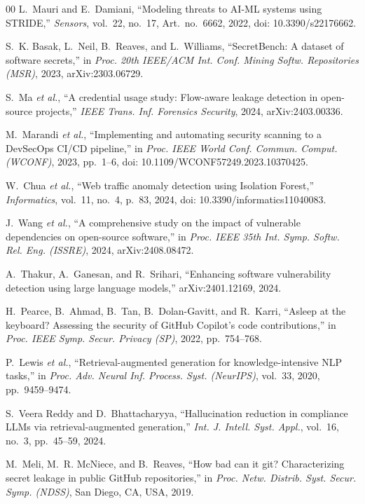 \documentclass[conference]{IEEEtran}
\begin{document}
\begin{thebibliography}{00}
L.~Mauri and E.~Damiani, ``Modeling threats to AI-ML systems using STRIDE,''
\textit{Sensors}, vol.~22, no.~17, Art.~no.~6662, 2022,
doi: 10.3390/s22176662.

S.~K. Basak, L.~Neil, B.~Reaves, and L.~Williams, ``SecretBench: A dataset of
software secrets,'' in \textit{Proc. 20th IEEE/ACM Int. Conf. Mining Softw.
Repositories (MSR)}, 2023, arXiv:2303.06729.

S.~Ma \textit{et al.}, ``A credential usage study: Flow-aware leakage detection
in open-source projects,'' \textit{IEEE Trans. Inf. Forensics Security}, 2024,
arXiv:2403.00336.

M.~Marandi \textit{et al.}, ``Implementing and automating security scanning to a
DevSecOps CI/CD pipeline,'' in \textit{Proc. IEEE World Conf. Commun. Comput.
(WCONF)}, 2023, pp.~1--6, doi: 10.1109/WCONF57249.2023.10370425.

W.~Chua \textit{et al.}, ``Web traffic anomaly detection using Isolation
Forest,'' \textit{Informatics}, vol.~11, no.~4, p.~83, 2024,
doi: 10.3390/informatics11040083.

J.~Wang \textit{et al.}, ``A comprehensive study on the impact of vulnerable
dependencies on open-source software,'' in \textit{Proc. IEEE 35th Int. Symp.
Softw. Rel. Eng. (ISSRE)}, 2024, arXiv:2408.08472.

A.~Thakur, A.~Ganesan, and R.~Srihari, ``Enhancing software vulnerability
detection using large language models,'' arXiv:2401.12169, 2024.

H.~Pearce, B.~Ahmad, B.~Tan, B.~Dolan-Gavitt, and R.~Karri, ``Asleep at the
keyboard? Assessing the security of GitHub Copilot's code contributions,'' in
\textit{Proc. IEEE Symp. Secur. Privacy (SP)}, 2022, pp.~754--768.

P.~Lewis \textit{et al.}, ``Retrieval-augmented generation for
knowledge-intensive NLP tasks,'' in \textit{Proc. Adv. Neural Inf. Process. Syst.
(NeurIPS)}, vol.~33, 2020, pp.~9459--9474.

S.~Veera Reddy and D.~Bhattacharyya, ``Hallucination reduction in compliance
LLMs via retrieval-augmented generation,'' \textit{Int. J. Intell. Syst. Appl.},
vol.~16, no.~3, pp.~45--59, 2024.

M.~Meli, M.~R. McNiece, and B.~Reaves, ``How bad can it git? Characterizing
secret leakage in public GitHub repositories,'' in \textit{Proc. Netw. Distrib.
Syst. Secur. Symp. (NDSS)}, San Diego, CA, USA, 2019.


\end{thebibliography}
\end{document}

